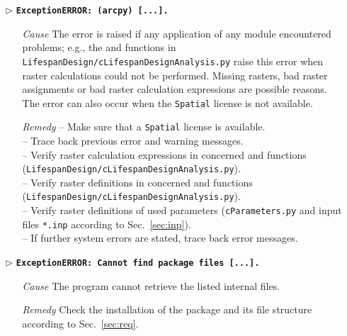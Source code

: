 \begin{itemize}
	\item[$\triangleright$]\textbf{\texttt{ExceptionERROR: (arcpy) [...].}}
	\begin{itemize}
		\item[\textit{Cause}\hspace{0.27cm}] The error is raised if any  application of any module encountered problems; e.g., the  and  functions in \texttt{LifespanDesign/cLifespanDesignAnalysis.py} raise this error when raster calculations could not be performed. Missing rasters, bad raster assignments or bad raster calculation expressions are possible reasons. The error can also occur when the \texttt{Spatial} license is not available.
		\item[\textit{Remedy}] -- Make sure that a \texttt{Spatial} license is available.\\
													 -- Trace back previous error and warning messages.\\
													 -- Verify raster calculation expressions in concerned  and  functions\\ \hspace{0.3cm} (\texttt{LifespanDesign/cLifespanDesignAnalysis.py}).\\
													 -- Verify raster definitions in concerned  and  functions (\texttt{LifespanDesign/cLifespanDesignAnalysis.py}).\\
													 -- Verify raster definitions of used parameters (\texttt{cParameters.py} and input files \texttt{*.inp} according to Sec.~\ref{sec:inp}).\\
													 -- If further system errors are stated, trace back error messages.\\
	\end{itemize}
	
	\item[$\triangleright$]\textbf{\texttt{ExceptionERROR: Cannot find package files [...].}}
	\begin{itemize}
		\item[\textit{Cause}\hspace{0.27cm}] The program cannot retrieve the listed internal files.
		\item[\textit{Remedy}] Check the installation of the package and its file structure according to Sec.~\ref{sec:req}.\\
	\end{itemize}
	

\end{itemize}
